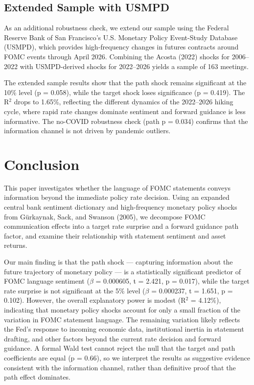 \documentclass[12pt]{article}
\begin{document}
\subsection{Extended Sample with USMPD}

As an additional robustness check, we extend our sample using the Federal Reserve Bank of San Francisco's U.S. Monetary Policy Event-Study Database (USMPD), which provides high-frequency changes in futures contracts around FOMC events through April 2026. Combining the Acosta (2022) shocks for 2006--2022 with USMPD-derived shocks for 2022--2026 yields a sample of 163 meetings.

The extended sample results show that the path shock remains significant at the 10\% level (p = 0.058), while the target shock loses significance (p = 0.419). The R$^2$ drops to 1.65\%, reflecting the different dynamics of the 2022--2026 hiking cycle, where rapid rate changes dominate sentiment and forward guidance is less informative. The no-COVID robustness check (path p = 0.034) confirms that the information channel is not driven by pandemic outliers.


\section{Conclusion}

This paper investigates whether the language of FOMC statements conveys information beyond the immediate policy rate decision. Using an expanded central bank sentiment dictionary and high-frequency monetary policy shocks from G\"urkaynak, Sack, and Swanson (2005), we decompose FOMC communication effects into a target rate surprise and a forward guidance path factor, and examine their relationship with statement sentiment and asset returns.

Our main finding is that the path shock --- capturing information about the future trajectory of monetary policy --- is a statistically significant predictor of FOMC language sentiment ($\beta$ = 0.000605, t = 2.421, p = 0.017), while the target rate surprise is not significant at the 5\% level ($\beta$ = 0.000237, t = 1.651, p = 0.102). However, the overall explanatory power is modest (R$^2$ = 4.12\%), indicating that monetary policy shocks account for only a small fraction of the variation in FOMC statement language. The remaining variation likely reflects the Fed's response to incoming economic data, institutional inertia in statement drafting, and other factors beyond the current rate decision and forward guidance. A formal Wald test cannot reject the null that the target and path coefficients are equal (p = 0.66), so we interpret the results as suggestive evidence consistent with the information channel, rather than definitive proof that the path effect dominates.
\end{document}
